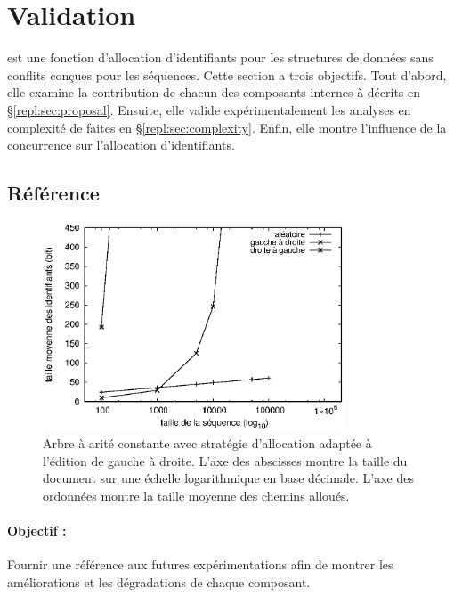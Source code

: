 
\section{Validation}
\label{repl:sec:validation}

\LSEQ est une fonction d'allocation d'identifiants pour les structures de
données sans conflits conçues pour les séquences.  Cette section a trois
objectifs. Tout d'abord, elle examine la contribution de chacun des composants
internes à \LSEQ décrits en §\ref{repl:sec:proposal}.  Ensuite, elle valide
expérimentalement les analyses en complexité de \LSEQ faites en
§\ref{repl:sec:complexity}.  Enfin, elle montre l'influence de la concurrence
sur l'allocation d'identifiants.


\subsection{Référence}

\begin{figure}
  \begin{center}
    \includegraphics[width=0.8\textwidth]{img/lseq/logoot.eps}
    \caption[Mesures de référence de la taille des chemins]
    {\label{repl:img:logoot} Arbre à arité constante avec stratégie d'allocation
      adaptée à l'édition de gauche à droite. L'axe des abscisses montre la
      taille du document sur une échelle logarithmique en base décimale. L'axe
      des ordonnées montre la taille moyenne des chemins alloués.}
  \end{center}
\end{figure}


\paragraph{Objectif :} Fournir une référence aux futures expérimentations afin
de montrer les améliorations et les dégradations de chaque composant.

